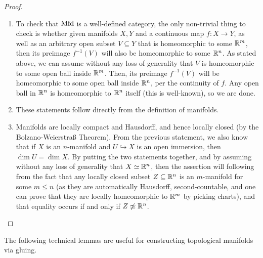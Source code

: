             \begin{proof}
                \begin{enumerate}
                    \item To check that $\mathrm{Mfd}$ is a well-defined category, the only non-trivial thing to check is whether given manifolds $X, Y$ and a continuous map $f: X \to Y$, as well as an arbitrary open subset $V \subseteq Y$ that is homeomorphic to some $\mathbb{R}^m$, then its preimage $f^{-1}(V)$ will also be homeomorphic to some $\mathbb{R}^n$. As stated above, we can assume without any loss of generality that $V$ is homeomorphic to some open ball inside $\mathbb{R}^m$. Then, its preimage $f^{-1}(V)$ will be homeomorphic to some open ball inside $\mathbb{R}^n$, per the continuity of $f$. Any open ball in $\mathbb{R}^n$ is homeomorphic to $\mathbb{R}^n$ itself (this is well-known), so we are done.
                    \item These statements follow directly from the definition of manifolds.
                    \item Manifolds are locally compact and Hausdorff, and hence locally closed (by the Bolzano-Weierstra{\ss} Theorem). From the previous statement, we also know that if $X$ is an $n$-manifold and $U \hookrightarrow  X$ is an open immersion, then $\dim U = \dim X$. By putting the two statements together, and by assuming without any loss of generality that $X \simeq \mathbb{R}^n$, then the assertion will following from the fact that any locally closed subset $Z \subseteq \mathbb{R}^n$ is an $m$-manifold for some $m \leq n$ (as they are automatically Hausdorff, second-countable, and one can prove that they are locally homeomorphic to $\mathbb{R}^m$ by picking charts), and that equality occurs if and only if $Z \not \simeq \mathbb{R}^n$.
                \end{enumerate}
            \end{proof}

        The following technical lemmas are useful for constructing topological manifolds via gluing.

